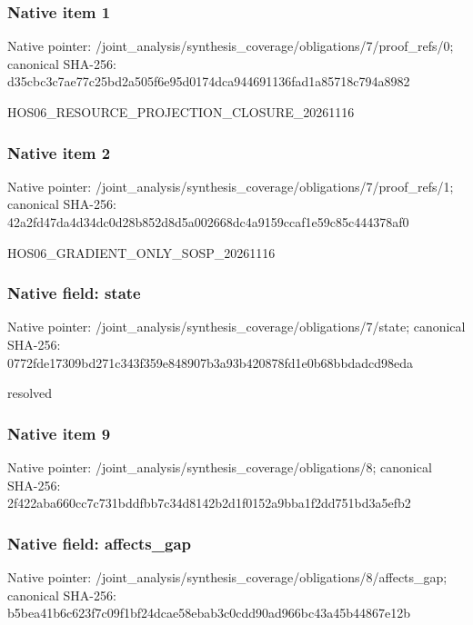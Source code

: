 \documentclass[10pt,a4paper]{article}
\begin{document}
\subsubsection{Native item 1}
Native pointer: /joint\_\allowbreak{}analysis/synthesis\_\allowbreak{}coverage/obligations/7/proof\_\allowbreak{}refs/0; canonical SHA-256: d35cbc3c7ae77c25bd2a505f6e95d0174dca944691136fad1a85718c794a8982

\begingroup\raggedright\sloppy HOS06\_\allowbreak{}RESOURCE\_\allowbreak{}PROJECTION\_\allowbreak{}CLOSURE\_\allowbreak{}20261116\par\endgroup

\subsubsection{Native item 2}
Native pointer: /joint\_\allowbreak{}analysis/synthesis\_\allowbreak{}coverage/obligations/7/proof\_\allowbreak{}refs/1; canonical SHA-256: 42a2fd47da4d34dc0d28b852d8d5a002668dc4a9159ccaf1e59c85c444378af0

\begingroup\raggedright\sloppy HOS06\_\allowbreak{}GRADIENT\_\allowbreak{}ONLY\_\allowbreak{}SOSP\_\allowbreak{}20261116\par\endgroup

\subsubsection{Native field: state}
Native pointer: /joint\_\allowbreak{}analysis/synthesis\_\allowbreak{}coverage/obligations/7/state; canonical SHA-256: 0772fde17309bd271c343f359e848907b3a93b420878fd1e0b68bbdadcd98eda

\begingroup\raggedright\sloppy resolved\par\endgroup

\subsubsection{Native item 9}
Native pointer: /joint\_\allowbreak{}analysis/synthesis\_\allowbreak{}coverage/obligations/8; canonical SHA-256: 2f422aba660cc7c731bddfbb7c34d8142b2d1f0152a9bba1f2dd751bd3a5efb2

\subsubsection{Native field: affects\_\allowbreak{}gap}
Native pointer: /joint\_\allowbreak{}analysis/synthesis\_\allowbreak{}coverage/obligations/8/affects\_\allowbreak{}gap; canonical SHA-256: b5bea41b6c623f7c09f1bf24dcae58ebab3c0cdd90ad966bc43a45b44867e12b
\end{document}
